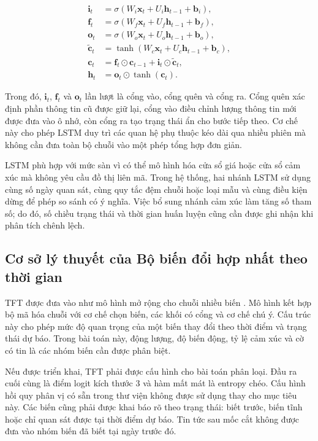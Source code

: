\documentclass[12pt, a4paper, oneside]{report}
\begin{document}
\begin{align}
  \mathbf{i}_t &= \sigma(W_i\mathbf{x}_t+U_i\mathbf{h}_{t-1}+\mathbf{b}_i),\\
  \mathbf{f}_t &= \sigma(W_f\mathbf{x}_t+U_f\mathbf{h}_{t-1}+\mathbf{b}_f),\\
  \mathbf{o}_t &= \sigma(W_o\mathbf{x}_t+U_o\mathbf{h}_{t-1}+\mathbf{b}_o),\\
  \widetilde{\mathbf{c}}_t &= \tanh(W_c\mathbf{x}_t+U_c\mathbf{h}_{t-1}+\mathbf{b}_c),\\
  \mathbf{c}_t &= \mathbf{f}_t\odot\mathbf{c}_{t-1}+
                 \mathbf{i}_t\odot\widetilde{\mathbf{c}}_t,\\
  \mathbf{h}_t &= \mathbf{o}_t\odot\tanh(\mathbf{c}_t).
  \label{eq:lstm-update}
\end{align}

Trong đó, $\mathbf{i}_t$, $\mathbf{f}_t$ và $\mathbf{o}_t$ lần lượt là cổng vào, cổng
quên và cổng ra. Cổng quên xác định phần thông tin cũ được giữ lại, cổng vào điều chỉnh
lượng thông tin mới được đưa vào ô nhớ, còn cổng ra tạo trạng thái ẩn cho bước tiếp
theo. Cơ chế này cho phép LSTM duy trì các quan hệ phụ thuộc kéo dài qua nhiều phiên mà
không cần đưa toàn bộ chuỗi vào một phép tổng hợp đơn giản.

LSTM phù hợp với mức sàn vì có thể mô hình hóa cửa sổ giá hoặc cửa sổ cảm xúc mà không
yêu cầu đồ thị liên mã. Trong hệ thống, hai nhánh LSTM sử dụng cùng số ngày quan sát,
cùng quy tắc đệm chuỗi hoặc loại mẫu và cùng điều kiện dừng để phép so sánh có ý nghĩa. Việc bổ sung nhánh cảm xúc làm tăng số tham số; do đó, số chiều trạng
thái và thời gian huấn luyện cũng cần được ghi nhận khi phân tích chênh lệch.

\subsection{Cơ sở lý thuyết của Bộ biến đổi hợp nhất theo thời gian}

TFT được đưa vào như mô hình mở rộng cho chuỗi nhiều biến
\cite{Lim2021_tft}. Mô hình kết hợp bộ mã hóa chuỗi với cơ chế chọn biến, các khối có
cổng và cơ chế chú ý. Cấu trúc này cho phép mức độ quan trọng của một biến thay đổi
theo thời điểm và trạng thái dự báo. Trong bài toán này, động lượng, độ biến động, tỷ lệ
cảm xúc và cờ có tin là các nhóm biến cần được phân biệt.

Nếu được triển khai, TFT phải được cấu hình cho bài toán phân loại. Đầu ra cuối cùng là
điểm logit kích thước 3 và hàm mất mát là entropy chéo. Cấu hình hồi quy phân vị có sẵn
trong thư viện không được sử dụng thay cho mục tiêu này. Các biến cũng phải được khai
báo rõ theo trạng thái: biết trước, biến tĩnh hoặc chỉ quan sát được tại thời điểm dự
báo. Tin tức sau mốc cắt không được đưa vào nhóm biến đã biết tại ngày trước đó.
\end{document}
